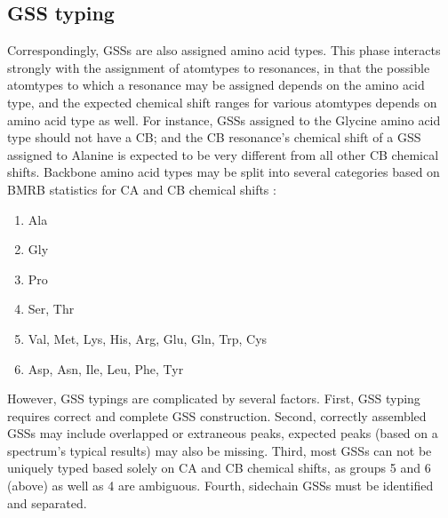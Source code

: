 \subsection*{GSS typing}
Correspondingly, GSSs are also assigned amino acid types.  This phase 
interacts strongly with the assignment of atomtypes to resonances, in 
that the possible atomtypes to which a resonance may be assigned depends 
on the amino acid type, and the expected chemical shift ranges for various 
atomtypes depends on amino acid type as well.  For instance, GSSs assigned 
to the Glycine amino acid type should not have a CB; and the CB resonance's 
chemical shift of a GSS assigned to Alanine is expected to be very different 
from all other CB chemical shifts.  Backbone amino acid types may be split 
into several categories \cite{saga} based on BMRB statistics for 
CA and CB chemical shifts \cite{bmrb}:
\begin{enumerate}
  \item Ala
  \item Gly 
  \item Pro
  \item Ser, Thr
  \item Val, Met, Lys, His, Arg, Glu, Gln, Trp, Cys
  \item Asp, Asn, Ile, Leu, Phe, Tyr
\end{enumerate}
However, GSS typings are complicated by several factors.  First, GSS typing 
requires correct and complete GSS construction.  Second, correctly assembled 
GSSs may include overlapped or extraneous peaks, expected peaks (based on a 
spectrum's typical results) may also be missing.  Third, most GSSs can not 
be uniquely typed based solely on CA and CB chemical shifts, as groups 5 and 
6 (above) as well as 4 are ambiguous.  Fourth, sidechain GSSs must be 
identified and separated.

